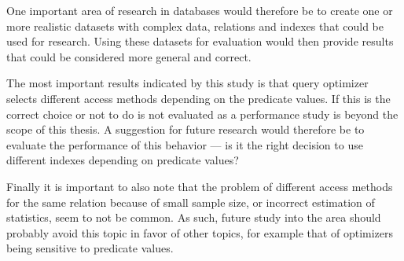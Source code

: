 One important area of research in databases would therefore be to create one or
more realistic datasets with complex data, relations and indexes that could be
used for research. Using these datasets for evaluation would then provide
results that could be considered more general and correct.

The most important results indicated by this study is that query optimizer
selects different access methods depending on the predicate values. If this
is the correct choice or not to do is not evaluated as a performance study is
beyond the scope of this thesis. A suggestion for future research would
therefore be to evaluate the performance of this behavior --- is it the right
decision to use different indexes depending on predicate values?

Finally it is important to also note that the problem of different access
methods for the same relation because of small sample size, or incorrect
estimation of statistics, seem to not be common. As such, future study into the
area should probably avoid this topic in favor of other topics, for example that
of optimizers being sensitive to predicate values.